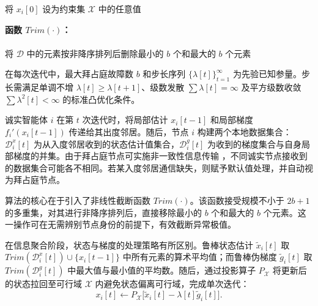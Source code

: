 \begin{algorithm}[H]
    将 $x_i[0]$ 设为约束集 $\mathcal{X}$ 中的任意值\;
    \caption{拜占庭容错梯度下降（诚实智能体 $i\in\mathcal{V}\setminus\mathcal{A}$ 的本地程序）}
    \label{alg:1}
    \noindent\textbf{函数 $Trim(\cdot)$：} \\
     \\
    将 $\mathcal{D}$ 中的元素按非降序排列后删除最小的 $b$ 个和最大的 $b$ 个元素 \\
\end{algorithm}

在每次迭代中，最大拜占庭故障数 $b$ 和步长序列 $\{\lambda[t]\}_{t=1}^{\infty}$ 为先验已知参量。步长需满足单调不增 $\lambda[t] \ge \lambda[t+1]$、级数发散 $\sum \lambda[t] = \infty$ 及平方级数收敛 $\sum \lambda^2[t] < \infty$ 的标准凸优化条件。

诚实智能体 $i$ 在第 $t$ 次迭代时，将局部估计 $x_i[t-1]$ 和局部梯度 $f_i'(x_i[t-1])$ 传递给其出度邻居。随后，节点 $i$ 构建两个本地数据集合：$\mathcal{D}_i^x[t]$ 为从入度邻居收到的状态估计值集合，$\mathcal{D}_i^g[t]$ 为收到的梯度集合与自身局部梯度的并集。由于拜占庭节点可实施非一致性信息传输 \cite{fischer1985impossibility}，不同诚实节点接收到的数据集合可能各不相同。若某入度邻居通信缺失，则赋予默认值处理，并自动视为拜占庭节点。

算法的核心在于引入了非线性截断函数 $Trim(\cdot)$。该函数接受规模不小于 $2b+1$ 的多重集，对其进行非降序排列后，直接移除最小的 $b$ 个和最大的 $b$ 个元素。这一操作可在无需辨别节点身份的前提下，有效截断异常极值。

在信息聚合阶段，状态与梯度的处理策略有所区别。鲁棒状态估计 $\widetilde{x}_i[t]$ 取 $Trim(\mathcal{D}_i^x[t]) \cup \{x_i[t-1]\}$ 中所有元素的算术平均值；而鲁棒伪梯度 $\widetilde{g}_i[t]$ 取 $Trim(\mathcal{D}_i^g[t])$ 中最大值与最小值的平均数。随后，通过投影算子 $P_{\mathcal{X}}$ 将更新后的状态拉回至可行域 $\mathcal{X}$ 内避免状态偏离可行域，完成单次迭代：
\begin{equation}
    x_i[t] \leftarrow P_{\mathcal{X}}\bigl[\widetilde{x}_i[t] - \lambda[t]\widetilde{g}_i[t]\bigr].
    \label{eq:update}
\end{equation}

